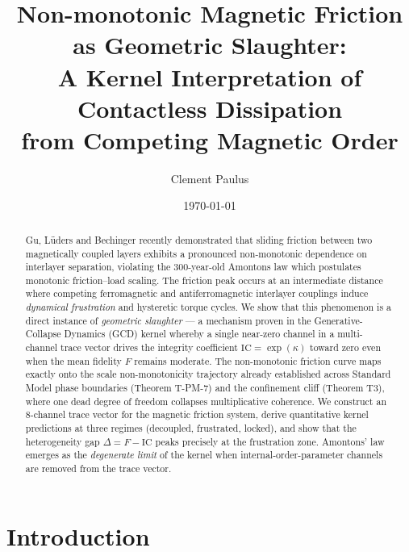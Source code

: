 \documentclass[
  aps,
  prd,
  twocolumn,
  superscriptaddress,
  nofootinbib,
  floatfix
]{revtex4-2}
\newcommand{\IC}{\mathrm{IC}}
\begin{document}
\title{Non-monotonic Magnetic Friction as Geometric Slaughter:\\
A Kernel Interpretation of Contactless Dissipation\\
from Competing Magnetic Order}

\author{Clement Paulus}

\date{\today}

\begin{abstract}
Gu, L\"uders and Bechinger recently demonstrated that sliding friction
between two magnetically coupled layers exhibits a pronounced
non-monotonic dependence on interlayer separation, violating the
300-year-old Amontons law which postulates monotonic friction--load
scaling.  The friction peak occurs at an intermediate distance where
competing ferromagnetic and antiferromagnetic interlayer couplings
induce \emph{dynamical frustration} and hysteretic torque cycles.
We show that this phenomenon is a direct instance of
\emph{geometric slaughter} --- a mechanism proven in the
Generative-Collapse Dynamics (GCD) kernel whereby a single
near-zero channel in a multi-channel trace vector drives the
integrity coefficient $\IC = \exp(\kappa)$ toward zero even
when the mean fidelity $F$ remains moderate.
The non-monotonic friction curve maps exactly onto the
scale non-monotonicity trajectory already established across
Standard Model phase boundaries (Theorem T-PM-7) and the
confinement cliff (Theorem T3), where one dead degree of
freedom collapses multiplicative coherence.
We construct an 8-channel trace vector for the magnetic
friction system, derive quantitative kernel predictions
at three regimes (decoupled, frustrated, locked), and
show that the heterogeneity gap $\Delta = F - \IC$
peaks precisely at the frustration zone.
Amontons' law emerges as the \emph{degenerate limit}
of the kernel when internal-order-parameter channels are
removed from the trace vector.
\end{abstract}

\maketitle

\section{Introduction}\label{sec:intro}
\end{document}
